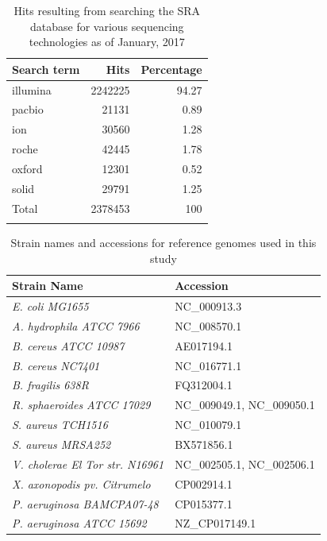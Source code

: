 \documentclass[10pt]{article}
\begin{document}
\begin{table}[]
  \centering
  \caption{Hits resulting from searching the SRA database for various sequencing technologies as of January, 2017}
  \label{table:searchterms}
  \begin{tabular}{lrr}
    \toprule
    Search term & Hits & Percentage \\
    \midrule
    illumina & 2242225 & 94.27 \\
    pacbio & 21131 & 0.89 \\
    ion & 30560 & 1.28 \\
    roche & 42445 & 1.78 \\
    oxford & 12301 & 0.52 \\
    solid & 29791 & 1.25 \\
    \arrayrulecolor{lgray}\hline
    Total & 2378453 & 100\\
    \arrayrulecolor{black}
    \bottomrule
\end{tabular}
\end{table}


\begin{table}[]
\centering
\caption{Strain names and accessions for reference genomes used in this study}
\label{table:strainlist}
\begin{tabular}{ll}
  \toprule
  Strain Name & Accession \\
  \midrule
  \textit{E. coli MG1655} & NC\_000913.3 \\
  \textit{A. hydrophila ATCC 7966} & NC\_008570.1 \\
  \textit{B. cereus ATCC 10987} & AE017194.1 \\
  \textit{B. cereus NC7401} & NC\_016771.1 \\
  \textit{B. fragilis 638R} & FQ312004.1 \\
  \textit{R. sphaeroides ATCC 17029} & NC\_009049.1, NC\_009050.1 \\
  \textit{S. aureus TCH1516} & NC\_010079.1 \\
  \textit{S. aureus MRSA252} & BX571856.1 \\
  \textit{V. cholerae El Tor str. N16961} & NC\_002505.1, NC\_002506.1 \\
  \textit{X. axonopodis pv. Citrumelo} & CP002914.1 \\
  \textit{P. aeruginosa BAMCPA07-48} & CP015377.1 \\
  \textit{P. aeruginosa ATCC 15692} & NZ\_CP017149.1\\
  \bottomrule

\end{tabular}
\end{table}
\end{document}
